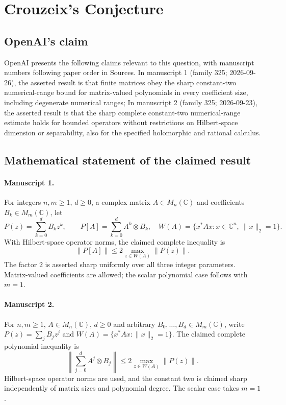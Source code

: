 \documentclass[11pt]{article}
\begin{document}
\section*{Crouzeix's Conjecture}

\subsection{OpenAI's claim}
OpenAI presents the following claims relevant to this question, with manuscript numbers following paper order in Sources. In manuscript 1 (family 325; 2026-09-26), the asserted result is that finite matrices obey the sharp constant-two numerical-range bound for matrix-valued polynomials in every coefficient size, including degenerate numerical ranges; In manuscript 2 (family 325; 2026-09-23), the asserted result is that the sharp complete constant-two numerical-range estimate holds for bounded operators without restrictions on Hilbert-space dimension or separability, also for the specified holomorphic and rational calculus.

\subsection{Mathematical statement of the claimed result}
\paragraph{Manuscript 1.}
For integers $n,m\ge1$, $d\ge0$, a complex matrix $A\in M_n(\mathbb C)$ and coefficients $B_k\in M_m(\mathbb C)$, let
\[
 P(z)=\sum_{k=0}^d B_kz^k,\qquad P[A]=\sum_{k=0}^d A^k\otimes B_k,
 \quad W(A)=\{x^*Ax:x\in\mathbb C^n,\ \|x\|_2=1\}.
\]
With Hilbert-space operator norms, the claimed complete inequality is
\[
 \|P[A]\|\le2\max_{z\in W(A)}\|P(z)\|.
\]
The factor $2$ is asserted sharp uniformly over all three integer parameters. Matrix-valued coefficients are allowed; the scalar polynomial case follows with $m=1$.

\paragraph{Manuscript 2.}
For $n,m\ge1$, $A\in M_n(\mathbb C)$, $d\ge0$ and arbitrary $B_0,\ldots,B_d\in M_m(\mathbb C)$, write $P(z)=\sum_jB_jz^j$ and $W(A)=\{x^*Ax:\|x\|_2=1\}$. The claimed complete polynomial inequality is
\[
 \left\|\sum_{j=0}^dA^j\otimes B_j\right\|\le2\max_{z\in W(A)}\|P(z)\|.
\]
Hilbert-space operator norms are used, and the constant two is claimed sharp independently of matrix sizes and polynomial degree. The scalar case takes $m=1$.
\end{document}

